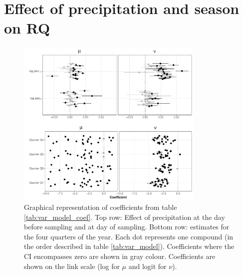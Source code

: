 \documentclass[pdftex,
	a4paper,
	titlepage=false]{scrreprt}
\begin{document}
\chapter{Effect of precipitation and season on RQ}


\newpage


\begin{figure}[ht]
	\centering
	\includegraphics[width = 0.8\textwidth]{coefs}
	\caption[Graphical representation of coefficients from table \ref{tab:var_model_coef}.]{Graphical representation of coefficients from table \ref{tab:var_model_coef}. Top row: Effect of precipitation at the day before sampling and at day of sampling. Bottom row: estimates for the four quarters of the year. Each dot represents one compound (in the order described in table \ref{tab:var_model}). Coefficients where the CI encompasses zero are shown in gray colour. Coefficients are shown on the link scale (log for $\mu$ and logit for $\nu$).}
	\label{fig:coefs}
\end{figure}
\end{document}

